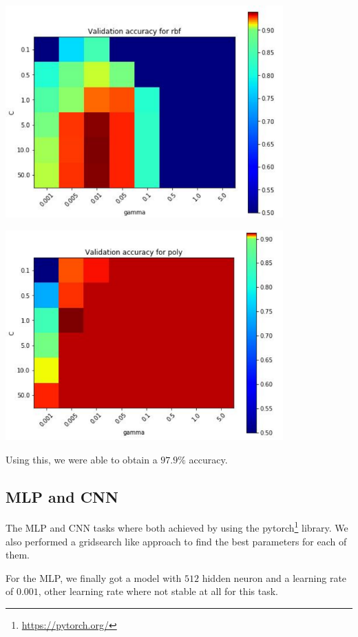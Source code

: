\documentclass[a4paper,11pt]{report}
\begin{document}
\begin{minipage}{0.49\textwidth}
  \includegraphics[width=0.8\textwidth]{figures/hm1.pdf}
\end{minipage}
\hfill
\begin{minipage}{0.49\textwidth}
  \includegraphics[width=0.8\textwidth]{figures/hm2.pdf}
\end{minipage}

Using this, we were able to obtain a $97.9\%$ accuracy.

\subsection*{MLP and CNN}

The MLP and CNN tasks where both achieved by using the
pytorch\footnote{\url{https://pytorch.org/}} library. We also performed a
gridsearch like approach to find the best parameters for each of them.

For the MLP, we finally got a model with $512$ hidden neuron and a learning rate
of $0.001$, other learning rate where not stable at all for this task.
\end{document}
